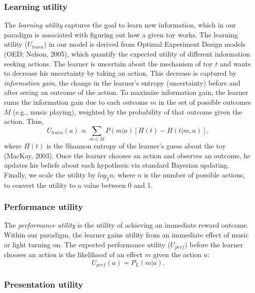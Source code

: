 \documentclass[10pt, letterpaper]{article}
\begin{document}
\hypertarget{learning-utility}{%
\subsubsection{Learning utility}\label{learning-utility}}

The \emph{learning utility} captures the goal to learn new information,
which in our paradigm is associated with figuring out how a given toy
works. The learning utility (\(U_{learn}\)) in our model is derived from
Optimal Experiment Design models (OED; Nelson, 2005), which quantify the
expected utility of different information seeking actions. The learner
is uncertain about the mechanism of toy \(t\) and wants to decrease his
uncertainty by taking an action. This decrease is captured by
\emph{information gain}, the change in the learner's entropy
(uncertainty) before and after seeing an outcome of the action. To
maximize information gain, the learner sums the information gain due to
each outcome \(m\) in the set of possible outcomes \(M\) (e.g., music
playing), weighted by the probability of that outcome given the action.
Thus,
\[ U_{learn}(a) \propto \sum_{m \in M}{P(m|a)}[{H(t) - H(t | m,a)}],\]
\noindent where \(H(t)\) is the Shannon entropy of the learner's guess
about the toy (MacKay, 2003). Once the learner chooses an action and
observes an outcome, he updates his beliefs about each hypothesis via
standard Bayesian updating. Finally, we scale the utility by \(log_2n\),
where \(n\) is the number of possible actions, to convert the utility to
a value between 0 and 1.

\hypertarget{performance-utility}{%
\subsubsection{Performance utility}\label{performance-utility}}

The \emph{performance utility} is the utility of achieving an immediate
reward outcome. Within our paradigm, the learner gains utility from an
immediate effect of music or light turning on. The expected performance
utility (\(U_{perf}\)) before the learner chooses an action is the
likelihood of an effect \(m\) given the action \(a\):
\[ U_{perf}(a) = P_L(m | a).\] \noindent

\hypertarget{presentation-utility}{%
\subsubsection{Presentation utility}\label{presentation-utility}}
\end{document}
